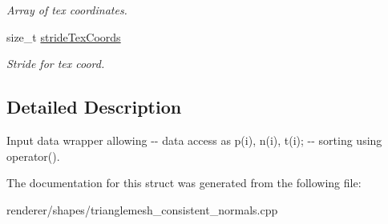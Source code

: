 \begin{DoxyCompactItemize}
\begin{DoxyCompactList}\small\item\em Array of tex coordinates. \item\end{DoxyCompactList}\item 
\hypertarget{structembree_1_1_input_data3_a0bfa76c26c7ca711488dea456c7d024b}{
size\_\-t \hyperlink{structembree_1_1_input_data3_a0bfa76c26c7ca711488dea456c7d024b}{strideTexCoords}}
\label{structembree_1_1_input_data3_a0bfa76c26c7ca711488dea456c7d024b}

\begin{DoxyCompactList}\small\item\em Stride for tex coord. \item\end{DoxyCompactList}\end{DoxyCompactItemize}


\subsection{Detailed Description}
Input data wrapper allowing -\/-\/ data access as p(i), n(i), t(i); -\/-\/ sorting using operator(). 

The documentation for this struct was generated from the following file:\begin{DoxyCompactItemize}
\item 
renderer/shapes/trianglemesh\_\-consistent\_\-normals.cpp\end{DoxyCompactItemize}
